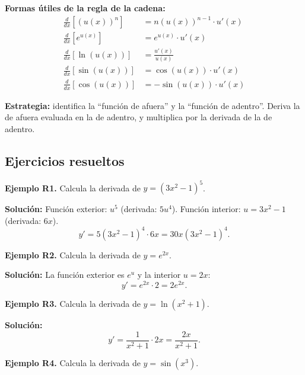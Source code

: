 \documentclass[12pt, a4paper]{article}
\begin{document}
\begin{cuadrosolucion}
  \textbf{Formas útiles de la regla de la cadena:}
  \begin{align*}
    \frac{d}{dx}[(u(x))^n]   & = n(u(x))^{n-1} \cdot u'(x) \\
    \frac{d}{dx}[e^{u(x)}]   & = e^{u(x)} \cdot u'(x)      \\
    \frac{d}{dx}[\ln(u(x))]  & = \frac{u'(x)}{u(x)}        \\
    \frac{d}{dx}[\sin(u(x))] & = \cos(u(x)) \cdot u'(x)    \\
    \frac{d}{dx}[\cos(u(x))] & = -\sin(u(x)) \cdot u'(x)
  \end{align*}
\end{cuadrosolucion}

\begin{cuadroadvertencia}
  \textbf{Estrategia:} identifica la ``función de afuera'' y la ``función de adentro''. Deriva la de afuera evaluada en la de adentro, y multiplica por la derivada de la de adentro.
\end{cuadroadvertencia}

\subsection{Ejercicios resueltos}

\textbf{Ejemplo R1.} Calcula la derivada de $y = (3x^2 - 1)^5$.

\begin{cuadrosolucion}
  \textbf{Solución:} Función exterior: $u^5$ (derivada: $5u^4$). Función interior: $u = 3x^2 - 1$ (derivada: $6x$).
  $$y' = 5(3x^2 - 1)^4 \cdot 6x = 30x(3x^2 - 1)^4.$$
\end{cuadrosolucion}

\textbf{Ejemplo R2.} Calcula la derivada de $y = e^{2x}$.

\begin{cuadrosolucion}
  \textbf{Solución:} La función exterior es $e^u$ y la interior $u = 2x$:
  $$y' = e^{2x} \cdot 2 = 2e^{2x}.$$
\end{cuadrosolucion}

\newpage

\textbf{Ejemplo R3.} Calcula la derivada de $y = \ln(x^2 + 1)$.

\begin{cuadrosolucion}
  \textbf{Solución:}
  $$y' = \frac{1}{x^2 + 1} \cdot 2x = \frac{2x}{x^2 + 1}.$$
\end{cuadrosolucion}

\textbf{Ejemplo R4.} Calcula la derivada de $y = \sin(x^3)$.
\end{document}
